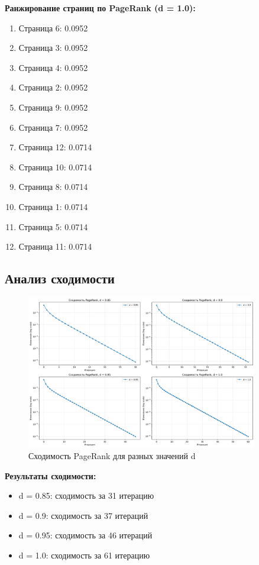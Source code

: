 \textbf{Ранжирование страниц по PageRank (d = 1.0):}
\begin{enumerate}
    \item Страница 6: 0.0952
    \item Страница 3: 0.0952
    \item Страница 4: 0.0952
    \item Страница 2: 0.0952
    \item Страница 9: 0.0952
    \item Страница 7: 0.0952
    \item Страница 12: 0.0714
    \item Страница 10: 0.0714
    \item Страница 8: 0.0714
    \item Страница 1: 0.0714
    \item Страница 5: 0.0714
    \item Страница 11: 0.0714
\end{enumerate}

\subsection*{Анализ сходимости}

\begin{figure}[H]
    \centering
    \includegraphics[width=0.9\textwidth]{images/task2/pagerank_convergence.png}
    \caption{Сходимость PageRank для разных значений d}
\end{figure}

\textbf{Результаты сходимости:}
\begin{itemize}
    \item d = 0.85: сходимость за 31 итерацию
    \item d = 0.9: сходимость за 37 итераций
    \item d = 0.95: сходимость за 46 итераций
    \item d = 1.0: сходимость за 61 итерацию
\end{itemize}

